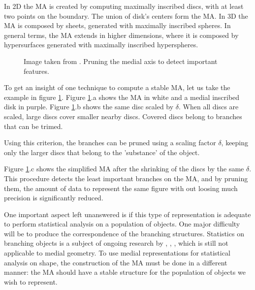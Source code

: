 In 2D the MA is created by computing maximally inscribed discs, with at least two 
points on the boundary. The union of disk's centers form the MA.
In 3D the MA is composed by sheets, generated with maximally inscribed spheres.
In general terms, the MA extends in higher dimensions, where it is composed by hypersurfaces
generated with maximally inscribed hyperspheres.

\begin{figure} 
 \centering 
 \caption[MA Pruning.]{Image taken from \cite{miklos2010discrete}. Pruning the medial axis to detect important features.}
 \label{fig:stableAxis}  
\end{figure}

To get an insight of one technique to compute a stable MA, let us take the example in 
figure \ref{fig:stableAxis}. Figure \ref{fig:stableAxis}.a shows 
the MA in white and a medial inscribed disk in purple.
Figure \ref{fig:stableAxis}.b shows the same disc scaled by $\delta$. 
When all discs are scaled, large discs cover smaller nearby
discs. Covered discs belong to branches that can be trimed. 

Using this criterion, the branches can be pruned using a
scaling factor $\delta$, keeping only the larger discs 
that belong to the 'substance' of the object.

Figure \ref{fig:stableAxis}.c shows the simplified MA after
the shrinking of the discs by the same $\delta$. 
This procedure detects the least important branches on the MA, and
by pruning them, the amount of data to represent the same figure with out loosing 
much precision is significantly reduced. 

One important aspect left unanswered is if this type of representation 
is adequate to perform statistical analysis on a population of objects. 
One major difficulty will be to produce the correspondence of the branching structures.
Statistics on branching objects is a subject of ongoing research by \cite{wang2007object}, \cite{sorensen2011dissimilarity}, 
\cite{aydin2011visualizing}, 
which is still not applicable to medial geometry. 
To use medial representations for statistical analysis on shape, 
the construction of the MA must be done in a different manner: 
the MA should have a stable structure for the population of objects we wish to represent. 

